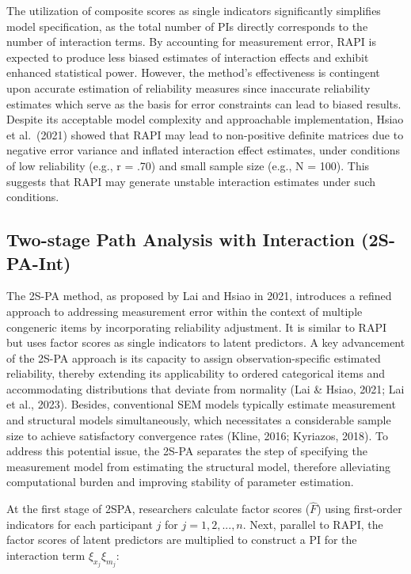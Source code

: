 \documentclass[
  man]{apa7}
\begin{document}
The utilization of composite scores as single indicators significantly simplifies model specification, as the total number of PIs directly corresponds to the number of interaction terms. By accounting for measurement error, RAPI is expected to produce less biased estimates of interaction effects and exhibit enhanced statistical power. However, the method's effectiveness is contingent upon accurate estimation of reliability measures since inaccurate reliability estimates which serve as the basis for error constraints can lead to biased results. Despite its acceptable model complexity and approachable implementation, Hsiao et al.~(2021) showed that RAPI may lead to non-positive definite matrices due to negative error variance and inflated interaction effect estimates, under conditions of low reliability (e.g., r = .70) and small sample size (e.g., N = 100). This suggests that RAPI may generate unstable interaction estimates under such conditions.

\hypertarget{two-stage-path-analysis-with-interaction-2s-pa-int}{%
\subsection{Two-stage Path Analysis with Interaction (2S-PA-Int)}\label{two-stage-path-analysis-with-interaction-2s-pa-int}}

The 2S-PA method, as proposed by Lai and Hsiao in 2021, introduces a refined approach to addressing measurement error within the context of multiple congeneric items by incorporating reliability adjustment. It is similar to RAPI but uses factor scores as single indicators to latent predictors. A key advancement of the 2S-PA approach is its capacity to assign observation-specific estimated reliability, thereby extending its applicability to ordered categorical items and accommodating distributions that deviate from normality (Lai \& Hsiao, 2021; Lai et al., 2023). Besides, conventional SEM models typically estimate measurement and structural models simultaneously, which necessitates a considerable sample size to achieve satisfactory convergence rates (Kline, 2016; Kyriazos, 2018). To address this potential issue, the 2S-PA separates the step of specifying the measurement model from estimating the structural model, therefore alleviating computational burden and improving stability of parameter estimation.

At the first stage of 2SPA, researchers calculate factor scores (\(\hat{F}\)) using first-order indicators for each participant \(j\) for \(j = 1, 2, ..., n\). Next, parallel to RAPI, the factor scores of latent predictors are multiplied to construct a PI for the interaction term \(\xi_{x_{j}}\xi_{m_{j}}\):
\end{document}
